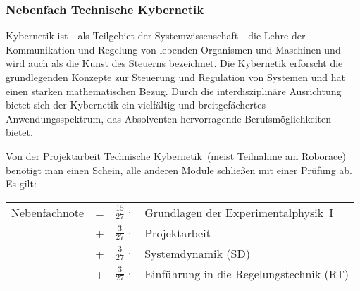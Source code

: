 \subsubsection{Nebenfach Technische Kybernetik}

Kybernetik ist - als Teilgebiet der Systemwissenschaft
- die Lehre der Kommunikation und Regelung
von lebenden Organismen und Maschinen und
wird auch als die Kunst des Steuerns bezeichnet.
Die Kybernetik erforscht die grundlegenden Konzepte
zur Steuerung und Regulation von Systemen und
hat einen starken mathematischen Bezug.
Durch die interdisziplinäre Ausrichtung
bietet sich der Kybernetik ein vielfältig und
breitgefächertes Anwendungsspektrum,
das Absolventen hervorragende Berufsmöglichkeiten bietet.



%
%
%

\begin{center}
\end{center}
Von der \glqq Projektarbeit Technische Kybernetik\grqq~(meist Teilnahme am Roborace) benötigt man einen Schein, alle anderen Module schließen mit einer Prüfung ab. Es gilt:\\[0.5ex]
\begin{tabular}{lcrl}
Nebenfachnote & = &$\frac{15}{27}\,\cdot$ &Grundlagen der Experimentalphysik~I\\[0.5ex]
              & + &$\frac{3}{27}\,\cdot$ &Projektarbeit\\ [0.5ex]
              & + &$\frac{3}{27}\,\cdot$ &Systemdynamik (SD)\\[0.5ex]
              & + &$\frac{3}{27}\,\cdot$ &Einführung in die Regelungstechnik (RT)\\ 
\end{tabular}

